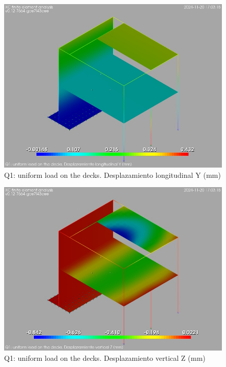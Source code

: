 \begin{figure}[ht]
\begin{center}
\includegraphics[width=\linewidth]{results/graphics/resSimplLC/QdecksuY.png}
\caption{Q1: uniform load on the decks. Desplazamiento longitudinal Y (mm)}
\label{QdecksuY}
\end{center}
\end{figure}
\begin{figure}[ht]
\begin{center}
\includegraphics[width=\linewidth]{results/graphics/resSimplLC/QdecksuZ.png}
\caption{Q1: uniform load on the decks. Desplazamiento vertical Z (mm)}
\label{QdecksuZ}
\end{center}
\end{figure}
